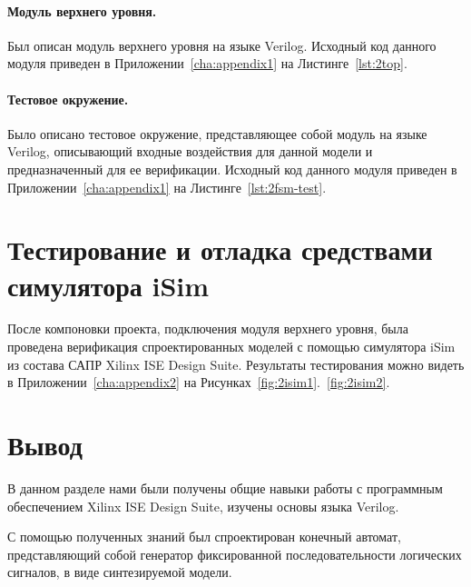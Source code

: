 \paragraph{Модуль верхнего уровня.}
Был описан модуль верхнего уровня на языке Verilog.
Исходный код данного модуля приведен в Приложении~\ref{cha:appendix1} на Листинге~\ref{lst:2top}.


\paragraph{Тестовое окружение.}
Было описано тестовое окружение, представляющее собой модуль на языке Verilog, описывающий входные воздействия для данной модели и предназначенный для ее верификации.
Исходный код данного модуля приведен в Приложении~\ref{cha:appendix1} на Листинге~\ref{lst:2fsm-test}.


\section{Тестирование и отладка средствами симулятора iSim}
После компоновки проекта, подключения модуля верхнего уровня, была проведена верификация спроектированных моделей с помощью симулятора iSim из состава САПР Xilinx ISE Design Suite. Результаты тестирования можно видеть в Приложении~\ref{cha:appendix2} на Рисунках~\ref{fig:2isim1}.~\ref{fig:2isim2}.



\section{Вывод}
  В данном разделе нами были получены общие навыки работы с программным обеспечением Xilinx ISE Design Suite, изучены основы языка Verilog.

С помощью полученных знаний был спроектирован конечный автомат, представляющий собой генератор
фиксированной последовательности логических сигналов, в виде синтезируемой модели.

